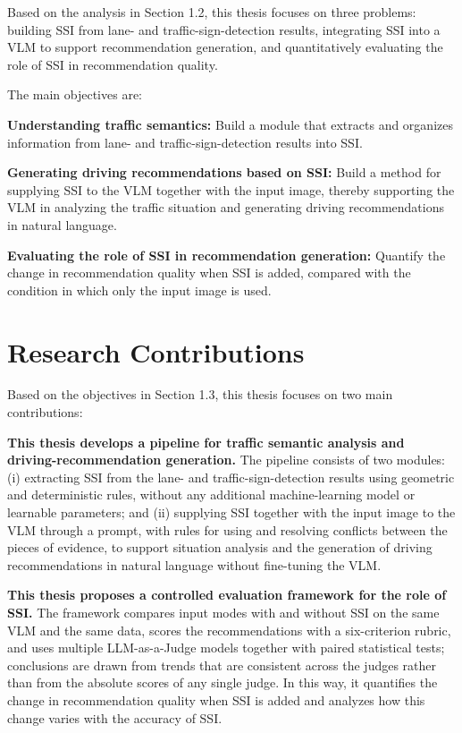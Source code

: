 \documentclass[12pt,a4paper]{report}
\begin{document}
Based on the analysis in Section 1.2, this thesis focuses on three problems: building SSI from lane- and traffic-sign-detection results, integrating SSI into a VLM to support recommendation generation, and quantitatively evaluating the role of SSI in recommendation quality.

The main objectives are:

\textbf{Understanding traffic semantics:} Build a module that extracts and organizes information from lane- and traffic-sign-detection results into SSI.

\textbf{Generating driving recommendations based on SSI:} Build a method for supplying SSI to the VLM together with the input image, thereby supporting the VLM in analyzing the traffic situation and generating driving recommendations in natural language.

\textbf{Evaluating the role of SSI in recommendation generation:} Quantify the change in recommendation quality when SSI is added, compared with the condition in which only the input image is used.

\section{Research Contributions}

Based on the objectives in Section 1.3, this thesis focuses on two main contributions:

\textbf{This thesis develops a pipeline for traffic semantic analysis and driving-recommendation generation.} The pipeline consists of two modules: (i) extracting SSI from the lane- and traffic-sign-detection results using geometric and deterministic rules, without any additional machine-learning model or learnable parameters; and (ii) supplying SSI together with the input image to the VLM through a prompt, with rules for using and resolving conflicts between the pieces of evidence, to support situation analysis and the generation of driving recommendations in natural language without fine-tuning the VLM.

\textbf{This thesis proposes a controlled evaluation framework for the role of SSI.} The framework compares input modes with and without SSI on the same VLM and the same data, scores the recommendations with a six-criterion rubric, and uses multiple LLM-as-a-Judge models together with paired statistical tests; conclusions are drawn from trends that are consistent across the judges rather than from the absolute scores of any single judge. In this way, it quantifies the change in recommendation quality when SSI is added and analyzes how this change varies with the accuracy of SSI.
\end{document}
